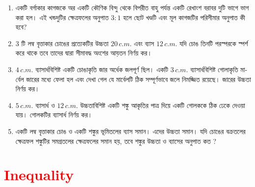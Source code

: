 \documentclass[11pt, a4paper]{article}
\begin{document}
\begin{enumerate}

	\item \textbengali{একটি বর্গাকার কাগজকে অর একটি কৌণিক বিন্দু থেকে বিপরীত বাহু পর্যন্ত একটি রেখাংশ বরাবর দুটি ভাগে ভাগ করা হল। এই খন্ডদুটির ক্ষেত্রফলের অনুপাত} $3:1$ \textbengali{হলে ছোট খণ্ডটি এবং মূল কাগজটির পরিসীমার অনুপাত কী হবে?}
	
	\item $3$ \textbengali{টি লম্ব বৃত্তাকার চোঙের প্রত্যেকটির উচ্চতা} $20\,c.m.$ \textbengali{এবং ব্যাস} $12\,c.m.$ \textbengali{যদি চোঙ তিনটি পরস্পরকে স্পর্শ করে থাকে তবে তাদের দ্বারা সীমাবদ্ধ অংশের আয়তন নির্ণয় কর।}

	\item $4\,c.m.$ \textbengali{ব্যাসার্ধবিশিষ্ট একটি চোঙাকৃতি জার অর্ধেক জলপূর্ণ ছিল। একটি} $3\,c.m.$ \textbengali{ব্যাসার্ধবিশিষ্ট গোলাকৃতি মার্বেল জারের মধ্যে ফেলা হল এবং দেখা গেল যে মার্বেলটি ঠিক সম্পূর্ণভাবে জলে নিমজ্জিত রয়েছে। জারের উচ্চতা নির্ণয় কর।}
	
	\item $5\,c.m.$ \textbengali{ব্যাসার্ধ ও} $12\,c.m.$ \textbengali{উচ্চতাবিশিষ্ট একটি শঙ্কু আকৃতির পাত্র দিয়ে একটি গোলককে ঠিক ঢেকে দেওয়া যায়। গোলকটির ব্যাসার্ধ নির্ণয় কর।}
	
	\item \textbengali{একটি লম্ব বৃত্তাকার চোঙ ও একটি শঙ্কুর ভূমিতলের ব্যাস সমান। এদের উচ্চতা সমান। যদি চোঙের বক্রতলের ক্ষেত্রফল শঙ্কুটির সমগ্রতলের ক্ষেত্রফলের সমান হয়, তবে শঙ্কুর উচ্চতা ও ব্যাসের অনুপাত কত ?}

\end{enumerate}


\section{\textcolor{red}{Inequality}}
\end{document}
